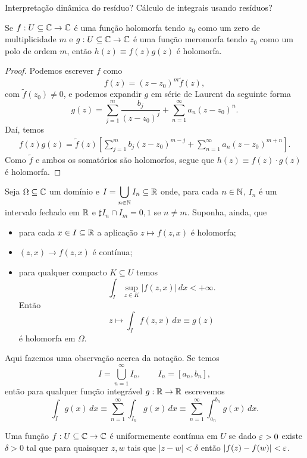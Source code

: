 Interpretação dinâmica do resíduo?
Cálculo de integrais usando resíduos?
%
\begin{lema}
\label{lema-zeros-vezes-polos}
Se $f:U\subseteq\mathbb{C}\to\mathbb{C}$ é uma função holomorfa tendo $z_0$ como um zero de multiplicidade
$m$ e $g:U\subseteq\mathbb{C}\to\mathbb{C}$ é uma função meromorfa tendo $z_0$ como um polo de ordem $m$, então
$h(z) \equiv f(z)g(z)$ é holomorfa.
\end{lema}
%
\begin{proof}
Podemos escrever $f$ como
%
\[
f(z) = (z - z_0)^m \widetilde{f}(z),
\]
%
com $\widetilde{f}(z_0) \neq 0$, e podemos expandir $g$ em série de Laurent da seguinte
forma
%
\[
g(z) = \sum_{j=1}^m \frac{b_j}{(z - z_0)^j} + \sum_{n=1}^{\infty} a_n (z - z_0)^n.
\]
%
Daí, temos
%
\begin{align*}
    f(z)g(z) = \widetilde{f}(z)
    \left[ \sum_{j=1}^m b_j (z - z_0)^{m-j} + \sum_{n=1}^{\infty} a_n (z - z_0)^{m+n} \right].
\end{align*}
%
Como $\widetilde{f}$ e ambos os somatórios são holomorfos, segue que $h(z) \equiv f(z) \cdot g(z)$ é 
holomorfa.
\end{proof}
%
\begin{teorema}
Seja $\Omega\subseteq\mathbb{C}$ um domínio e $I = \displaystyle{\bigcup_{n\in\mathbb{N}} I_n} \subseteq\mathbb{R}$ onde,
para cada $n\in\mathbb{N}$, $I_n$ é um intervalo fechado em $\mathbb{R}$ e $\sharp I_n \cap I_m = 0, 1$ se
$n\neq m$. Suponha, ainda, que
%
\begin{itemize}
    \item para cada $x\in I\subseteq\mathbb{R}$ a aplicação $z\mapsto f(z,x)$ é holomorfa;
    \item $(z,x) \to f(z,x)$ é contínua;
    \item para qualquer compacto $K\subseteq U$ temos
    \[
    \int_I \sup_{z\in K} |f(z,x)| \, dx < +\infty.
    \]
    Então
    \[
    z \mapsto \int_I f(z,x) \, dx \equiv g(z)
    \]
    é holomorfa em $\Omega$.
\end{itemize}
%
\end{teorema}
%
Aqui fazemos uma observação acerca da notação. Se temos
%
\[
I = \bigcup_{n=1}^{\infty} I_n, \qquad I_n = [a_n, b_n],
\]
%
então para qualquer função integrável $g:\mathbb{R}\to\mathbb{R}$ escrevemos
%
\[
\int_I g(x) \, dx 
\equiv \sum_{n=1}^{\infty} \int_{I_n} g(x) \, dx 
\equiv \sum_{n=1}^{\infty} \int_{a_n}^{b_n} g(x) \, dx.
\]
%
\begin{definicao}
\label{def-cont-unif}
Uma função $f:U\subseteq\mathbb{C}\to\mathbb{C}$ é uniformemente contínua em $U$ se dado $\varepsilon > 0$
existe $\delta > 0$ tal que para quaisquer $z,w$ tais que $|z-w| < \delta$ então
$|f(z) - f(w)| < \varepsilon$.
\end{definicao}
